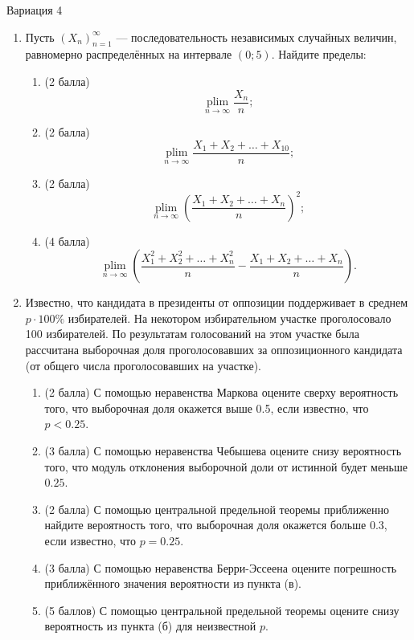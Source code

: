 \documentclass[12pt]{article}
\DeclareMathOperator*{\plim}{plim}
\begin{document}
\newpage


Вариация 4

\begin{enumerate}
\item Пусть $(X_n)_{n=1}^{\infty}$ — последовательность независимых случайных величин, равномерно распределённых на интервале $(0; 5)$. 
Найдите пределы:

\begin{enumerate}
    \item (2 балла) 
    \[
        \plim\limits_{n\to\infty} \frac{X_n}{n};
    \]
    \item (2 балла) 
    \[ 
        \plim\limits_{n\to\infty} \frac{X_1 + X_2 + \ldots + X_{10}}{n};
    \]
    \item (2 балла) 
    \[
         \plim\limits_{n\to\infty} \left(\frac{X_1 + X_2 + \ldots + X_n}{n}\right)^2;
         \]
    
    \item (4 балла) 
    \[
         \plim\limits_{n\to\infty} \left(\frac{X_1^2 + X_2^2 + \ldots + X_{n}^2}{n} - \frac{X_1 + X_2 + \ldots + X_{n}}{n}\right).
         \]
\end{enumerate}

\item Известно, что кандидата в президенты от оппозиции поддерживает в среднем $p\cdot 100\%$ избирателей. 
На некотором избирательном участке проголосовало 100 избирателей. 
По результатам голосований на этом участке была рассчитана выборочная доля проголосовавших 
за оппозиционного кандидата (от общего числа проголосовавших на участке).

\begin{enumerate}
    \item (2 балла) С помощью неравенства Маркова оцените сверху вероятность того, 
    что выборочная доля окажется выше 0.5, если известно, что $p<0.25$.
    \item (3 балла) С помощью неравенства Чебышева оцените снизу вероятность того, 
    что модуль отклонения выборочной доли от истинной будет меньше $0.25$.
    \item (2 балла) С помощью центральной предельной теоремы приближенно найдите вероятность того, 
    что выборочная доля окажется больше 0.3, если известно, что $p=0.25$.
    \item (3 балла) С помощью неравенства Берри-Эссеена оцените погрешность приближённого значения вероятности из пункта (в).
    \item (5 баллов) С помощью центральной предельной теоремы оцените снизу вероятность из пункта (б) для неизвестной $p$.
\end{enumerate}

\end{enumerate}
\end{document}
